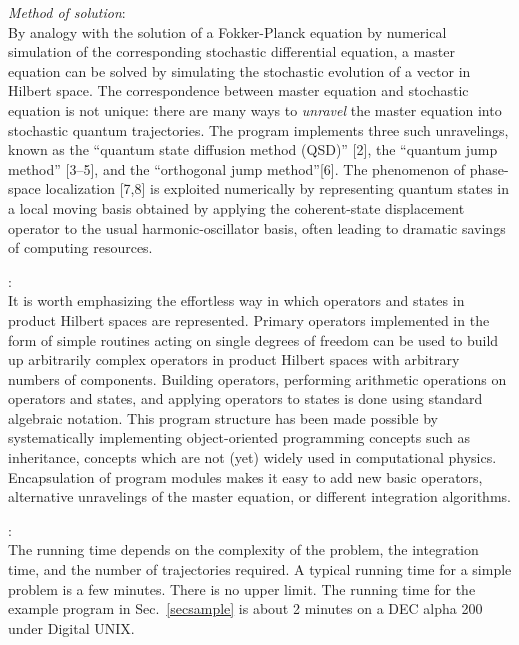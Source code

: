 \vspace{3mm}\noindent
{\it Method of solution\/}:\\
By analogy with the solution of a Fokker-Planck equation by numerical 
simulation of the corresponding stochastic differential equation, a master
equation can be solved by simulating the stochastic evolution of a vector in
Hilbert space. The correspondence between master
equation and stochastic equation is not unique: there are many ways to {\it
unravel\/} the master equation into stochastic quantum trajectories. The program
implements three such unravelings, known as the ``quantum state diffusion
method (QSD)'' [2],  the ``quantum jump method'' [3--5], and the ``orthogonal
jump method''[6]. The phenomenon of
phase-space localization [7,8] is exploited numerically by representing quantum
states in a local moving basis obtained by applying the coherent-state
displacement operator to the usual harmonic-oscillator basis, often leading to 
dramatic savings of computing resources.

\vspace{3mm}:\\ It is worth
emphasizing the effortless way in which operators and states in product Hilbert
spaces are represented. Primary operators implemented in the form of simple
routines acting on single degrees of freedom can be used to build up
arbitrarily complex operators in product Hilbert spaces with arbitrary numbers
of components. Building operators, performing arithmetic operations on
operators and states, and applying operators to states is done using standard
algebraic notation. This program structure has been made possible by
systematically implementing object-oriented programming concepts such as
inheritance, concepts which are not (yet) widely used in computational
physics. Encapsulation of program modules makes it easy to add new basic
operators, alternative unravelings of the master equation, or different
integration algorithms.

\vspace{3mm}:\\
The running time depends on the complexity of the problem, the integration
time, and the number of trajectories required. A typical running time for a
simple problem is a few minutes. There is no upper limit. The running time for
the example program in Sec.~\ref{secsample} is about 2 minutes on a DEC alpha
200 under Digital UNIX.

